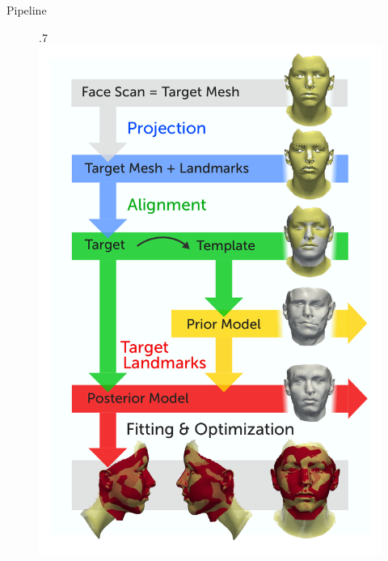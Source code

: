 \documentclass[xcolor=x11names,compress]{beamer}
\begin{document}
    \begin{frame}{Pipeline}
        \begin{figure}{.7\textwidth}
            \includegraphics[width=.9\textwidth]{../resources/figures/pipeline.pdf}
        \end{figure}
    \end{frame}

\end{document}
